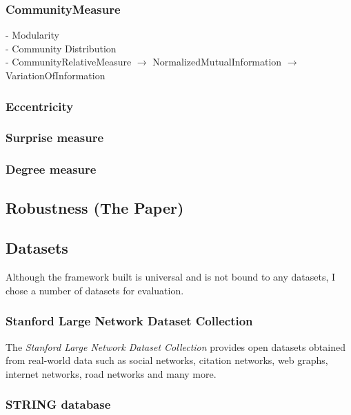 
\subsubsection{CommunityMeasure}
- Modularity\\
- Community Distribution\\
- CommunityRelativeMeasure $\rightarrow$ NormalizedMutualInformation $\rightarrow$ VariationOfInformation

\subsubsection{Eccentricity}

\subsubsection{Surprise measure}

\subsubsection{Degree measure}

\subsection{Robustness (The Paper)}

\subsection{Datasets}

Although the framework built is universal and is not bound to any datasets, I chose a number of datasets for evaluation.

\subsubsection{Stanford Large Network Dataset Collection}

The \textit{Stanford Large Network Dataset Collection}\cite{Large2016} provides open datasets obtained from real-world data such as social networks, citation networks, web graphs, internet networks, road networks and many more.

\subsubsection{STRING database}

